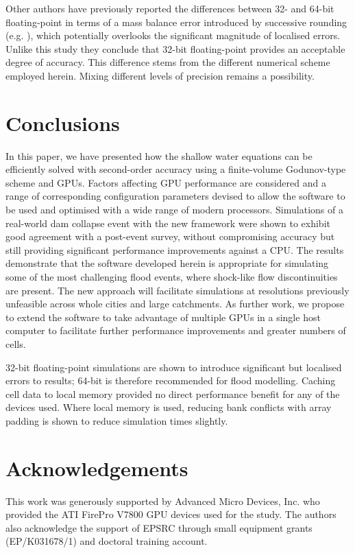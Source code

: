 \documentclass[11pt,english,a4paper]{article}
\begin{document}
Other authors have previously reported the differences between 32- and 64-bit floating-point in terms of a mass balance error introduced by successive rounding (e.g. \cite{Brodtkorb_10}), which potentially overlooks the significant magnitude of localised errors. Unlike this study they conclude that 32-bit floating-point provides an acceptable degree of accuracy. This difference stems from the different numerical scheme employed herein. Mixing different levels of precision remains a possibility. 

\section{Conclusions}

In this paper, we have presented how the shallow water equations can be efficiently solved with second-order accuracy using a finite-volume Godunov-type scheme and GPUs. Factors affecting GPU performance are considered and a range of corresponding configuration parameters devised to allow the software to be used and optimised with a wide range of modern processors. Simulations of a real-world dam collapse event with the new framework were shown to exhibit good agreement with a post-event survey, without compromising accuracy but still providing significant performance improvements against a CPU. The results demonstrate that the software developed herein is appropriate for simulating some of the most challenging flood events, where shock-like flow discontinuities are present. The new approach will facilitate simulations at resolutions previously unfeasible across whole cities and large catchments. As further work, we propose to extend the software to take advantage of multiple GPUs in a single host computer to facilitate further performance improvements and greater numbers of cells.

32-bit floating-point simulations are shown to introduce significant but localised errors to results; 64-bit is therefore recommended for flood modelling. Caching cell data to local memory provided no direct performance benefit for any of the devices used. Where local memory is used, reducing bank conflicts with array padding is shown to reduce simulation times slightly.

\section*{Acknowledgements}
This work was generously supported by Advanced Micro Devices, Inc. who provided the ATI FirePro V7800 GPU devices used for the study. The authors also acknowledge the support of EPSRC through small equipment grants (EP/K031678/1) and doctoral training account.



\end{document}
